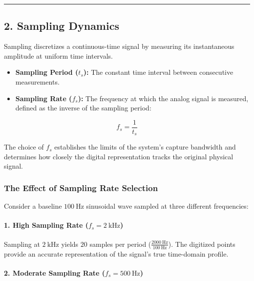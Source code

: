 \documentclass[
]{article}
\providecommand{\tightlist}{%
  \setlength{\itemsep}{0pt}\setlength{\parskip}{0pt}}
\begin{document}
\begin{center}\rule{0.5\linewidth}{0.5pt}\end{center}

\subsection{2. Sampling Dynamics}\label{sampling-dynamics}

Sampling discretizes a continuous-time signal by measuring its
instantaneous amplitude at uniform time intervals.

\begin{itemize}
\tightlist
\item
  \textbf{Sampling Period (\(t_s\)):} The constant time interval between
  consecutive measurements.
\item
  \textbf{Sampling Rate (\(f_s\)):} The frequency at which the analog
  signal is measured, defined as the inverse of the sampling period:
\end{itemize}

\[f_s = \frac{1}{t_s}\]

The choice of \(f_s\) establishes the limits of the system's capture
bandwidth and determines how closely the digital representation tracks
the original physical signal.

\subsubsection{The Effect of Sampling Rate
Selection}\label{the-effect-of-sampling-rate-selection}

Consider a baseline \(100\ \text{Hz}\) sinusoidal wave sampled at three
different frequencies:

\paragraph{\texorpdfstring{1. High Sampling Rate
(\(f_s = 2\ \text{kHz}\))}{1. High Sampling Rate (f\_s = 2\textbackslash{} \textbackslash text\{kHz\})}}\label{high-sampling-rate-f_s-2-textkhz}

Sampling at \(2\ \text{kHz}\) yields \(20\) samples per period
(\(\frac{2000\ \text{Hz}}{100\ \text{Hz}}\)). The digitized points
provide an accurate representation of the signal's true time-domain
profile.

\paragraph{\texorpdfstring{2. Moderate Sampling Rate
(\(f_s = 500\ \text{Hz}\))}{2. Moderate Sampling Rate (f\_s = 500\textbackslash{} \textbackslash text\{Hz\})}}\label{moderate-sampling-rate-f_s-500-texthz}
\end{document}
